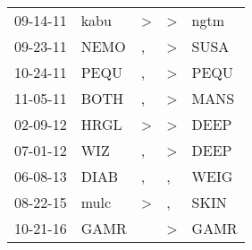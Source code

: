 \begin{supertabular}{p{0.07\textwidth}p{0.06\textwidth}p{0.02\textwidth}p{0.02\textwidth}p{0.06\textwidth}}
 09-14-11\textsuperscript{} &  kabu\textsuperscript{} &  \textgreater &  \textgreater &  ngtm\textsuperscript{} \\
 09-23-11\textsuperscript{} &  NEMO\textsuperscript{} &             , &  \textgreater &  SUSA\textsuperscript{} \\
 10-24-11\textsuperscript{} &  PEQU\textsuperscript{} &             , &  \textgreater &  PEQU\textsuperscript{} \\
 11-05-11\textsuperscript{} &  BOTH\textsuperscript{} &             , &  \textgreater &  MANS\textsuperscript{} \\
 02-09-12\textsuperscript{} &  HRGL\textsuperscript{} &  \textgreater &  \textgreater &  DEEP\textsuperscript{} \\
 07-01-12\textsuperscript{} &   WIZ\textsuperscript{} &             , &  \textgreater &  DEEP\textsuperscript{} \\
 06-08-13\textsuperscript{} &  DIAB\textsuperscript{} &             , &             , &  WEIG\textsuperscript{} \\
 08-22-15\textsuperscript{} &  mulc\textsuperscript{} &  \textgreater &             , &  SKIN\textsuperscript{} \\
 10-21-16\textsuperscript{} &  GAMR\textsuperscript{} &               &  \textgreater &  GAMR\textsuperscript{} \\
\end{supertabular}
